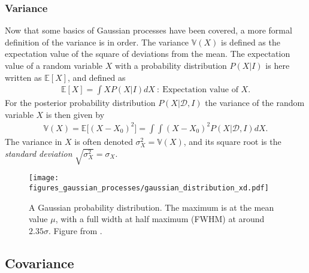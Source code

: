 \documentclass[twoside,english]{uiofysmaster}
\begin{document}
\subsubsection{Variance}

Now that some basics of Gaussian processes have been covered, a more formal definition of the variance is in order. The variance $\mathbb{V} (X)$ is defined as the expectation value of the square of deviations from the mean. The expectation value of a random variable $X$ with a probability distribution $P(X | I)$ is here written as $\mathbb{E}[X]$, and defined as
\begin{align}
\mathbb{E}[X] = \int X P(X | I) dX ~:~ \text{Expectation value of }X.
\end{align}
 For the posterior probability distribution $P(X| \mathcal{D}, I)$ the variance of the random variable $X$ is then given by \cite{sivia2006data}
\begin{align}\label{Eq:: gaussian process : variance X 1dim}
\mathbb{V}(X) = \mathbb{E} \big[ (X - X_0)^2 \big] = \int \int (X - X_0)^2 P (X| \mathcal{D}, I) dX.
\end{align}
The variance in $X$ is often denoted $\sigma_X^2 = \mathbb{V}(X)$, and its square root is the \textit{standard deviation} $\sqrt{\sigma^2_X} = \sigma_X$. 



\begin{figure}
\centering
\texttt{[image: figures\_gaussian\_processes/gaussian\_distribution\_xd.pdf]}
\caption{A Gaussian probability distribution. The maximum is at the mean value $\mu$, with a full width at half maximum (FWHM) at around $2.35 \sigma$. Figure from \cite{sivia2006data}.}
\label{Fig:: gaussian process : Gaussian distribution}
\end{figure}

\subsection{Covariance}\label{Sec:: gaussian process : Covariance}
\end{document}

